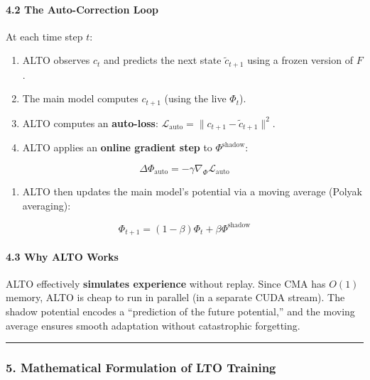 \documentclass[
  11pt,
  a4paper,
]{article}
\providecommand{\tightlist}{%
  \setlength{\itemsep}{0pt}\setlength{\parskip}{0pt}}
\begin{document}
\paragraph{4.2 The Auto-Correction Loop}\label{the-auto-correction-loop}

At each time step \(t\):

\begin{enumerate}
\def\labelenumi{\arabic{enumi}.}
\tightlist
\item
  ALTO observes \(c_t\) and predicts the next state \(\tilde{c}_{t+1}\)
  using a frozen version of \(F\).
\item
  The main model computes \(c_{t+1}\) (using the live \(\Phi_t\)).
\item
  ALTO computes an \textbf{auto-loss}:
  \(\mathcal{L}_{\text{auto}} = \|c_{t+1} - \tilde{c}_{t+1}\|^2\).
\item
  ALTO applies an \textbf{online gradient step} to
  \(\Phi^{\text{shadow}}\):
\end{enumerate}

\[\Delta \Phi_{\text{auto}} = -\gamma \nabla_{\Phi} \mathcal{L}_{\text{auto}}\]

\begin{enumerate}
\def\labelenumi{\arabic{enumi}.}
\setcounter{enumi}{4}
\tightlist
\item
  ALTO then updates the main model's potential via a moving average
  (Polyak averaging):
\end{enumerate}

\[\Phi_{t+1} = (1 - \beta) \Phi_t + \beta \Phi^{\text{shadow}}\]

\paragraph{4.3 Why ALTO Works}\label{why-alto-works}

ALTO effectively \textbf{simulates experience} without replay. Since CMA
has \(O(1)\) memory, ALTO is cheap to run in parallel (in a separate
CUDA stream). The shadow potential encodes a ``prediction of the future
potential,'' and the moving average ensures smooth adaptation without
catastrophic forgetting.

\begin{center}\rule{0.5\linewidth}{0.5pt}\end{center}

\subsubsection{5. Mathematical Formulation of LTO
Training}\label{mathematical-formulation-of-lto-training}
\end{document}
